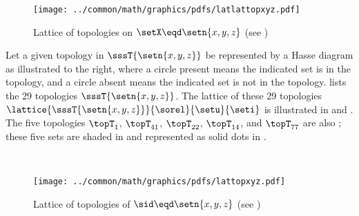 \begin{figure}[th]
  \centering%
  \texttt{[image: ../common/math/graphics/pdfs/latlattopxyz.pdf]}%
  \caption{
    Lattice of topologies on $\setX\eqd\setn{x,y,z}$ (see )
    \label{fig:set_latlat_top_xyz}
    }
\end{figure}
\begin{minipage}{\tw-45mm}
\begin{example}
\label{ex:set_lat_top_xyz}
\footnotemark
Let a given topology in $\sssT{\setn{x,y,z}}$ be represented by a Hasse diagram 
as illustrated to the right, where a circle present means the indicated set is in the topology,
and a circle absent means the indicated set is not in the topology.
 lists the 29 topologies $\sssT{\setn{x,y,z}}$.
The lattice of these 29 topologies $\lattice{\sssT{\setn{x,y,z}}}{\sorel}{\setu}{\seti}$
is illustrated in  and .
The five topologies
$\topT_{1}$, $\topT_{41}$, $\topT_{22}$, $\topT_{14}$, and $\topT_{77}$
are also ; 
these five sets are shaded in  and represented as solid dots in
.
\end{example}%
\end{minipage}%
\hfill%
%
\hfill\mbox{}\\


\begin{figure}[th]
  \centering%
  \texttt{[image: ../common/math/graphics/pdfs/lattopxyz.pdf]}%
  \caption{
    Lattice of topologies of $\sid\eqd\setn{x,y,z}$ (see )
    \label{fig:set_lat_top_xyz}
    }
\end{figure}


